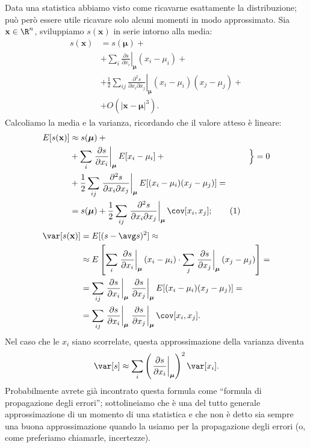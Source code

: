Data una statistica abbiamo visto come ricavarne esattamente la distribuzione;
può però essere utile ricavare solo alcuni momenti in modo approssimato.
Sia $\mathbf x\in\R^n$, sviluppiamo $s(\mathbf x)$ in serie intorno alla media:
%
\begin{align*}
	s(\mathbf x) &= s(\boldsymbol \mu) + {}\\
	&+ \sum_i \left.\frac{\partial s}{\partial x_i}\right|_{\boldsymbol\mu} (x_i - \mu_i) + {}\\
	&+ \frac12 \sum_{ij} \left.\frac{\partial^2 s}{\partial x_i \partial x_j}\right|_{\boldsymbol\mu} (x_i-\mu_i)(x_j-\mu_j) + {}\\
	&+ O(|\mathbf x - \boldsymbol\mu|^3).
\end{align*}
Calcoliamo la media e la varianza, ricordando che il valore atteso è lineare:
\begin{align*}
	E[s(\mathbf x)] &\approx s(\boldsymbol \mu) + {}\\
	&+ \sum_i \left.\frac{\partial s}{\partial x_i}\right|_{\boldsymbol\mu} E[x_i - \mu_i] + {} & \Big\} = 0\\
	&+ \frac12 \sum_{ij} \left.\frac{\partial^2 s}{\partial x_i \partial x_j}\right|_{\boldsymbol\mu} E[(x_i-\mu_i)(x_j-\mu_j)] = \\
	&= s(\boldsymbol \mu) +
	\frac12 \sum_{ij} \left.\frac{\partial^2 s}{\partial x_i \partial x_j}\right|_{\boldsymbol\mu}
	\cov[x_i,x_j]; \refstepcounter{equation}\tag{\theequation}\label{eq:meantaylor}
\end{align*}
\begin{align*}
	\var[s(\mathbf x)] &= E[(s - \avg s)^2] \approx \\
	&\approx E\left[
	\sum_i \left.\frac{\partial s}{\partial x_i}\right|_{\boldsymbol\mu} (x_i - \mu_i) \cdot
	\sum_j \left.\frac{\partial s}{\partial x_j}\right|_{\boldsymbol\mu} (x_j - \mu_j) \right] = \\
	&= \sum_{ij}
	\left.\frac{\partial s}{\partial x_i}\right|_{\boldsymbol\mu}
	\left.\frac{\partial s}{\partial x_j}\right|_{\boldsymbol\mu}
	E[ (x_i - \mu_i) (x_j - \mu_j) ] = \\
	&= \sum_{ij}
	\left.\frac{\partial s}{\partial x_i}\right|_{\boldsymbol\mu}
	\left.\frac{\partial s}{\partial x_j}\right|_{\boldsymbol\mu}
	\cov[x_i,x_j].
\end{align*}
Nel caso che le $x_i$ siano scorrelate, questa approssimazione della varianza diventa
\begin{equation*}
	\var[s] \approx \sum_i
	\left( \left.\frac{\partial s}{\partial x_i}\right|_{\boldsymbol\mu} \right)^2
	\var[x_i].
\end{equation*}
Probabilmente avrete già incontrato questa formula come ``formula di propagazione degli errori'';
sottolineiamo che è una del tutto generale approssimazione di un momento di una statistica e che non è detto sia sempre una buona approssimazione quando la usiamo per la propagazione degli errori (o, come preferiamo chiamarle, incertezze).

